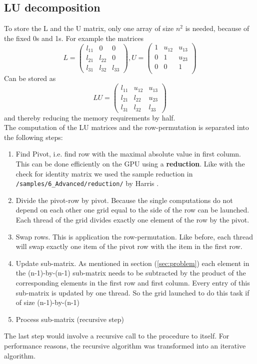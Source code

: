 \subsection*{LU decomposition}
To store the L and the U matrix, only one array of size $n^2$ is needed, because of the fixed 0s and 1s. For example the matrices
\begin{equation*}
 L = \begin{pmatrix} l_{11}  & 0 & 0\\ 
l_{21} & l_{22} & 0\\
l_{31} & l_{32} & l_{33}
\end{pmatrix}, U = \begin{pmatrix} 1 & u_{12} & u_{13}\\
0 & 1 & u_{23}\\
0 & 0 & 1\\
\end{pmatrix} 
\end{equation*}
Can be stored as
\begin{equation*}
LU = \begin{pmatrix} l_{11}  &  u_{12} & u_{13}\\
l_{21} & l_{22} & u_{23}\\
l_{31} & l_{32} & l_{33}
\end{pmatrix}
\end{equation*}
and thereby reducing the memory requirements by half.
\vspace{0.3cm}\\
The computation of the LU matrices and the row-permutation is separated into the following steps:
\begin{enumerate}
	\item Find Pivot, i.e. find row with the maximal absolute value in first column.\\
	This can be done efficiently on the GPU using a \textbf{reduction}. Like with the check for identity matrix we used the sample reduction in \texttt{/samples/6\_Advanced/reduction/} by Harris \cite{Harris2010}.
	\item Divide the pivot-row by pivot. Because the single computations do not depend on each other one grid equal to the side of the row can be launched. Each thread of the grid divides exactly one element of the row by the pivot. 
	\item Swap rows. This is application the row-permutation. Like before, each thread will swap exactly one item of the pivot row with the item in the first row.
	\item Update sub-matrix. As mentioned in section (\ref{sec:problem}) each element in the (n-1)-by-(n-1) sub-matrix needs to be subtracted by the product of the corresponding elements in the first row and first column. Every entry of this sub-matrix is updated by one thread. So the grid launched to do this task if of size (n-1)-by-(n-1)
	\item Process sub-matrix (recursive step)
\end{enumerate}
The last step would involve a recursive call to the procedure to itself. For performance reasons, the recursive algorithm was transformed into an iterative algorithm.
